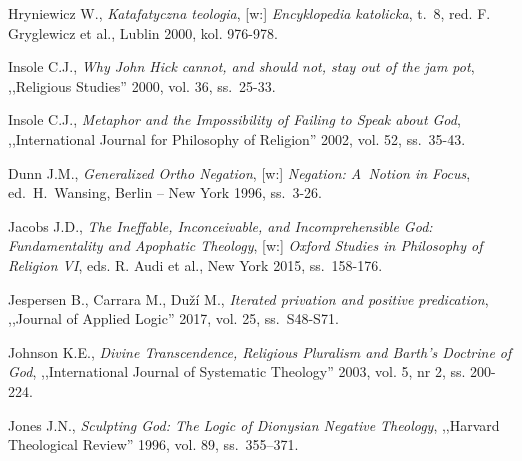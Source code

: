\begin{thebibliography}{100}
Hryniewicz W., \textit{Katafatyczna teologia}, [w:] \textit{Encyklopedia katolicka}, t.~8, red. F. Gryglewicz et al., Lublin 2000, kol. 976-978.

Insole C.J., \textit{Why John Hick cannot, and should not, stay out of the jam pot}, ,,Religious Studies'' 2000, vol. 36, ss.~25-33.

Insole C.J., \textit{Metaphor and the Impossibility of Failing to Speak about God}, ,,International Journal for Philosophy of Religion'' 2002, vol. 52, ss.~35-43.

Dunn J.M., \textit{Generalized Ortho Negation}, [w:] \textit{Negation: A~Notion in Focus}, ed.~H.~Wansing, Berlin -- New York 1996, ss.~3-26.

Jacobs J.D., \textit{The Ineffable, Inconceivable, and Incomprehensible God: Fundamentality and Apophatic Theology},
[w:] \textit{Oxford Studies in Philosophy of Religion VI}, eds. R. Audi et al., New York 2015, ss.~158-176.

Jespersen B., Carrara M., Duží M., \textit{Iterated privation and positive predication}, ,,Journal of Applied Logic'' 2017, vol. 25, ss.~S48-S71.


Johnson K.E., \textit{Divine Transcendence, Religious Pluralism and Barth's Doctrine of God}, ,,International Journal of Systematic Theology'' 2003, vol. 5, nr 2, ss. 200-224.

Jones J.N., \textit{Sculpting God: The Logic of Dionysian Negative Theology}, ,,Harvard Theological Review'' 1996, vol. 89, ss.~355–371.




\end{thebibliography}
